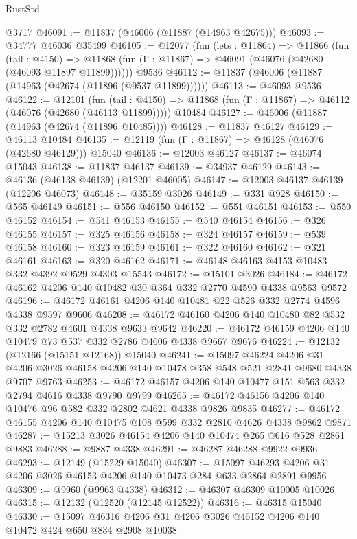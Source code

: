 \begin{lexlean}{RustStd}
\begin{coremodule}
    @3717
@46091 := @11837 (@46006 (@11887 (@14963 @42675)))
@46093 := @34777 @46036 @35499
@46105 := @12077
    (fun (lets : @11864) =>
    @11866
      (fun (tail : @4150) =>
      @11868 (fun (Γ : @11867) => @46091 (@46076 (@42680 (@46093 @11897 @11899))))))
    @9536
@46112 := @11837 (@46006 (@11887 (@14963 (@42674 (@11896 (@9537 @11899))))))
@46113 := @46093 @9536
@46122 := @12101
    (fun (tail : @4150) => @11868 (fun (Γ : @11867) => @46112 (@46076 (@42680 (@46113 @11899)))))
    @10484
@46127 := @46006 (@11887 (@14963 (@42674 (@11896 @10485))))
@46128 := @11837 @46127
@46129 := @46113 @10484
@46135 := @12119 (fun (Γ : @11867) => @46128 (@46076 (@42680 @46129))) @15040
@46136 := @12003 @46127
@46137 := @46074 @15043
@46138 := @11837 @46137
@46139 := @34937 @46129
@46143 := @46136 (@46138 @46139) (@12201 @46005)
@46147 := @12003 @46137 @46139 (@12206 @46073)
@46148 := @35159 @3026
@46149 := @331 @928
@46150 := @565 @46149
@46151 := @556 @46150
@46152 := @551 @46151
@46153 := @550 @46152
@46154 := @541 @46153
@46155 := @540 @46154
@46156 := @326 @46155
@46157 := @325 @46156
@46158 := @324 @46157
@46159 := @539 @46158
@46160 := @323 @46159
@46161 := @322 @46160
@46162 := @321 @46161
@46163 := @320 @46162
@46171 := @46148 @46163 @4153 @10483 @332 @4392 @9529 @4303 @15543
@46172 := @15101 @3026
@46184 := @46172 @46162 @4206 @140 @10482 @30 @364 @332 @2770 @4590 @4338 @9563 @9572
@46196 := @46172 @46161 @4206 @140 @10481 @22 @526 @332 @2774 @4596 @4338 @9597 @9606
@46208 := @46172 @46160 @4206 @140 @10480 @82 @532 @332 @2782 @4601 @4338 @9633 @9642
@46220 := @46172 @46159 @4206 @140 @10479 @73 @537 @332 @2786 @4606 @4338 @9667 @9676
@46224 := @12132 (@12166 (@15151 @12168)) @15040
@46241 := @15097
    @46224
    @4206
    @31
    @4206
    @3026
    @46158
    @4206
    @140
    @10478
    @358
    @548
    @521
    @2841
    @9680
    @4338
    @9707
    @9763
@46253 := @46172 @46157 @4206 @140 @10477 @151 @563 @332 @2794 @4616 @4338 @9790 @9799
@46265 := @46172 @46156 @4206 @140 @10476 @96 @582 @332 @2802 @4621 @4338 @9826 @9835
@46277 := @46172 @46155 @4206 @140 @10475 @108 @599 @332 @2810 @4626 @4338 @9862 @9871
@46287 := @15213 @3026 @46154 @4206 @140 @10474 @265 @616 @528 @2861 @9883
@46288 := @9887 @4338
@46291 := @46287 @46288 @9922 @9936
@46293 := @12149 (@15229 @15040)
@46307 := @15097 @46293 @4206 @31 @4206 @3026 @46153 @4206 @140 @10473 @284 @633 @2864 @2891 @9956
@46309 := @9960 (@9963 @4338)
@46312 := @46307 @46309 @10005 @10026
@46315 := @12132 (@12520 (@12145 @12522))
@46316 := @46315 @15040
@46330 := @15097 @46316 @4206 @31 @4206 @3026 @46152 @4206 @140 @10472 @424 @650 @834 @2908 @10038

\end{coremodule}
\end{lexlean}
